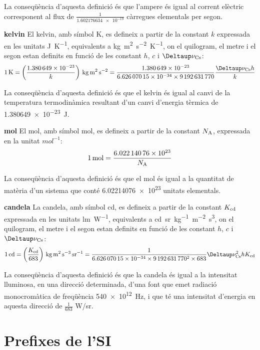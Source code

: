 \begin{list}{}
    La conseqüència d'aquesta definició és que l'ampere és igual al corrent elèctric corresponent al flux de $\frac{1}{\num{1,602176634 e-19}}$  càrregues elementals per segon.

   \item[\textbf{kelvin}]  El kelvin, amb símbol K, es defineix a partir de la constant $k$ expressada en les unitats \si{J.K^{-1}},  equivalents a \si{kg.m^2.s^{-2}.K^{-1}},  on el quilogram, el metre i el segon estan definits en funció de les constant $h$, $c$ i $\Deltaup\nu\ped{Cs}$:
       \[
            \SI{1}{K} = \left(\frac{\num{1,380649e-23}}{k}\right)\si{\,kg.m^2.s^{-2}} = \frac{\num{1,380649e-23}}{\num{6,62607015 e-34}\times\num{9192631770}} \frac{\Deltaup\nu\ped{Cs} h}{k}
       \]

    La conseqüència d'aquesta definició és que el kelvin és igual al canvi de la temperatura termodinàmica resultant d'un canvi d'energia tèrmica de \SI{1,380649e-23}{J}.

   \item[\textbf{mol}]  El mol, amb símbol mol, es defineix a partir de la constant $N_\mathrm{A}$, expressada en la unitat  $\si{mol^{-1}}$:
       \[
            \SI{1}{mol} = \frac{\num{6,02214076 e23}}{N_\mathrm{A}}
       \]

    La conseqüència d'aquesta definició és que el mol és igual a la quantitat de matèria d'un sistema que conté
    \num{6,02214076 e23} unitats elementals.

   \item[\textbf{candela}] La candela, amb símbol cd, es defineix a partir de la constant $K_\mathrm{cd}$ expressada en les unitats \si{lm.W^{-1}},  equivalents a \si{cd.sr.kg^{-1}.m^{-2}.s^3},  on el quilogram, el metre i el segon estan definits en funció de les constant $h$, $c$ i $\Deltaup\nu\ped{Cs}$:
       \[
            \SI{1}{cd} = \left(\frac{K\ped{cd}}{683}\right)\si{\,kg.m^2.s^{-3}.sr^{-1}} = \frac{1}{\num{6,62607015 e-34}\times\num{9192631770}^2\times 683} \Deltaup\nu\ped{Cs}^2 h K\ped{cd}
       \]

    La conseqüència d'aquesta definició és que la candela és igual a la intensitat lluminosa, en una direcció determinada,   d'una font que emet radiació monocromàtica de freqüència \SI{540e12}{Hz}, i
   que té una intensitat d'energia en aquesta direcció de $\frac{1}{683}$ \si{W/sr}.
\end{list}



\section{Prefixes de l'SI}

